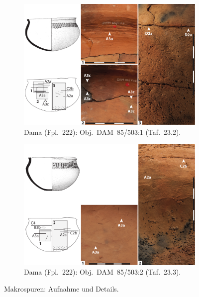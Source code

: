 \begin{multicols}{2}
\begin{figure}[p]
	\centering
	\begin{subfigure}{\textwidth}
		\centering
		\includegraphics[width = \textwidth]{fig/Abb_Macrotraces/DAM85-503-a.pdf}
		\caption{Dama (Fpl.~222): Obj.~DAM~85/503:1 (Taf.~23.2).\vspace{1em}}
		\label{DAM85-503-1_Makrospuren}
	\end{subfigure}
	\begin{subfigure}{\textwidth}
		\centering
		\includegraphics[width = \textwidth]{fig/Abb_Macrotraces/DAM85-503-b.pdf}
		\caption{Dama (Fpl.~222): Obj.~DAM~85/503:2 (Taf.~23.3).}
		\label{DAM85-503-2_Makrospuren}
	\end{subfigure}
	\caption{Makrospuren: Aufnahme und Details.}
	\label{DAM85-503_Makrospuren}
\end{figure}


\end{multicols}
